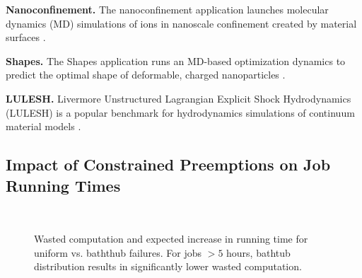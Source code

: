 
\noindent \textbf{Nanoconfinement.}
The nanoconfinement application launches molecular dynamics (MD) simulations of ions in nanoscale confinement created by material surfaces \cite{jyto,kadupitiya2017}.

\noindent \textbf{Shapes.} The Shapes application runs an MD-based optimization dynamics to predict the optimal shape of deformable, charged nanoparticles \cite{jto1,jjzo1}. 

\noindent \textbf{LULESH.} Livermore Unstructured Lagrangian Explicit Shock Hydrodynamics (LULESH)  is a popular benchmark for hydrodynamics simulations of continuum material models \cite{IPDPS13:LULESH,LULESH2:changes}. 






\subsection{Impact of Constrained Preemptions on Job Running Times}

\begin{figure}[t]
  \\
    \caption{Wasted computation and expected increase in running time for uniform vs. baththub failures. For jobs $>5$ hours, bathtub distribution results in significantly lower wasted computation.}
  \label{fig:vs-uniform-both}
  
\end{figure}

